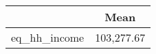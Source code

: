 {
\def\sym#1{\ifmmode^{#1}\else\(^{#1}\)\fi}
\begin{tabular}{l*{1}{c}}
\toprule
                    &        Mean\\
\midrule
eq\_hh\_income        &  103,277.67\\
\bottomrule
\end{tabular}
}
